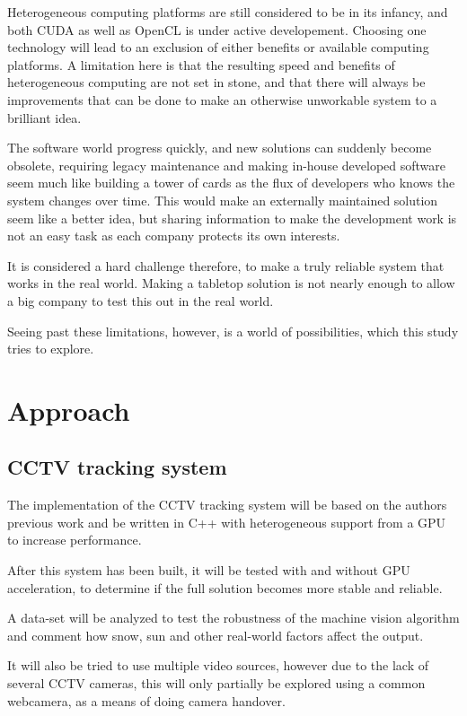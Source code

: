 Heterogeneous computing platforms are still considered to be in its infancy, and both CUDA as well as OpenCL is under active developement. Choosing one technology will lead to an exclusion of either benefits or available computing platforms. A limitation here is that the resulting speed and benefits of heterogeneous computing are not set in stone, and that there will always be improvements that can be done to make an otherwise unworkable system to a brilliant idea.

The software world progress quickly, and new solutions can suddenly become obsolete, requiring legacy maintenance and making in-house developed software seem much like building a tower of cards as the flux of developers who knows the system changes over time. This would make an externally maintained solution seem like a better idea, but sharing information to make the development work is not an easy task as each company protects its own interests.

It is considered a hard challenge therefore, to make a truly reliable system that works in the real world. Making a tabletop solution is not nearly enough to allow a big company to test this out in the real world.

Seeing past these limitations, however, is a world of possibilities, which this study tries to explore.

\section{Approach}
\subsection{CCTV tracking system}
The implementation of the CCTV tracking system will be based on the authors previous work and be written in C++ with heterogeneous support from a GPU to increase performance.

After this system has been built, it will be tested with and without GPU acceleration, to determine if the full solution becomes more stable and reliable.

A data-set will be analyzed to test the robustness of the machine vision algorithm and comment how snow, sun and other real-world factors affect the output.

It will also be tried to use multiple video sources, however due to the lack of several CCTV cameras, this will only partially be explored using a common webcamera, as a means of doing camera handover.

